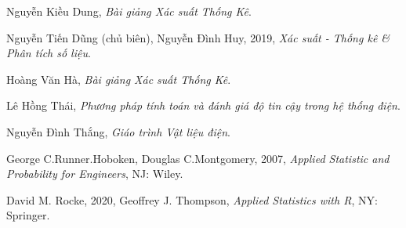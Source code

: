 \documentclass[a4paper]{article}
\begin{document}
\newpage
    \begin{center}
        \begin{thebibliography}{99}
            \item Nguyễn Kiều Dung, \textit{Bài giảng Xác suất Thống Kê}.
            \item Nguyễn Tiến Dũng (chủ biên), Nguyễn Đình Huy, 2019, \textit{Xác suất - Thống kê \& Phân tích số liệu}.
            \item Hoàng Văn Hà, \textit{Bài giảng Xác suất Thống Kê}.
            \item Lê Hồng Thái, \textit{Phương pháp tính toán và đánh giá độ tin cậy trong hệ thống điện}.
            \item Nguyễn Đình Thắng, \textit{Giáo trình Vật liệu điện}.
            \item George C.Runner.Hoboken, Douglas C.Montgomery, 2007, \textit{Applied Statistic and Probability for Engineers}, NJ: Wiley.
            \item David M. Rocke, 2020, Geoffrey J. Thompson, \textit{Applied Statistics with R}, NY: Springer.
        \end{thebibliography}
    \end{center}
\end{document}
